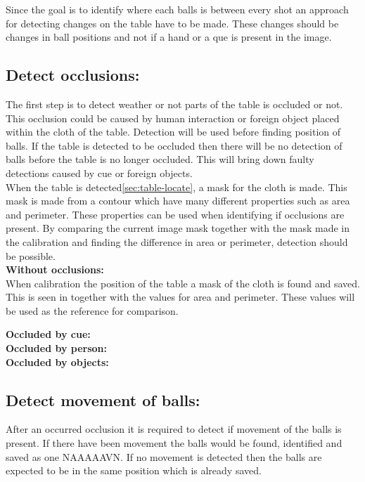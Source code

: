 Since the goal is to identify where each balls is between every shot an approach for detecting changes on the table have to be made. These changes should be changes in ball positions and not if a hand or a que is present in the image.\\

\subsection{Detect occlusions:}
The first step is to detect weather or not parts of the table is occluded or not. This occlusion could be caused by human interaction or foreign object placed within the cloth of the table. Detection will be used before finding position of balls. If the table is detected to be occluded then there will be no detection of balls before the table is no longer occluded. This will bring down faulty detections caused by cue or foreign objects.\\

When the table is detected\ref{sec:table-locate}, a mask for the cloth is made. This mask is made from a contour which have many different properties such as area and perimeter. These properties can be used when identifying if occlusions are present. By comparing the current image mask together with the mask made in the calibration and finding the difference in area or perimeter, detection should be possible.\\

\textbf{Without occlusions:}\\
When calibration the position of the table a mask of the cloth is found and saved. This is seen in %
together with the values for area and perimeter. These values will be used as the reference for comparison.



\textbf{Occluded by cue:}\\

\textbf{Occluded by person:}\\

\textbf{Occluded by objects:}\\


\subsection{Detect movement of balls:}
After an occurred occlusion it is required to detect if movement of the balls is present. If there have been movement the balls would be found, identified and saved as one NAAAAAVN. If no movement is detected then the balls are expected to be in the same position which is already saved.\\

